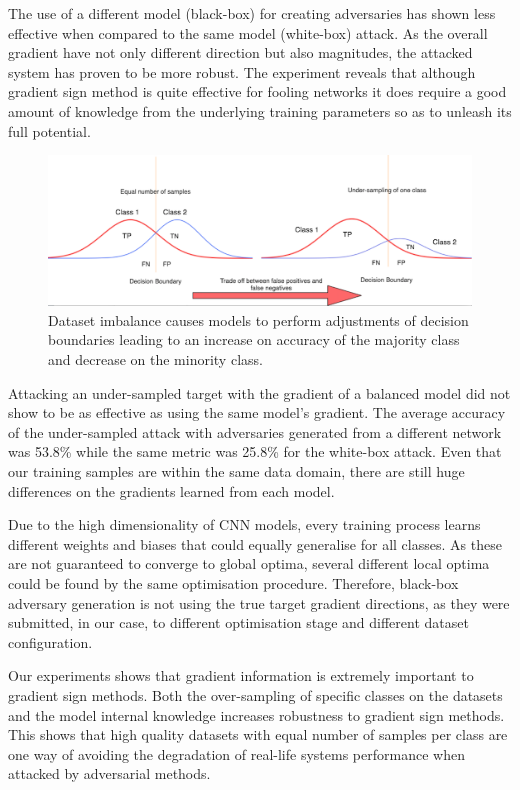 The use of a different model (black-box) for creating adversaries has shown less effective when compared to the same model (white-box) attack. As the overall gradient have not only different direction but also magnitudes, the attacked system has proven to be more robust. The experiment reveals that although gradient sign method is quite effective for fooling networks it does require a good amount of knowledge from the underlying training parameters so as to unleash its full potential.
\begin{figure}
	\centering
	\includegraphics[scale=0.32]{class_dist.png}
	\caption{Dataset imbalance causes models to perform adjustments of decision boundaries leading to an increase on accuracy of the majority class and decrease on the minority class.}
	\label{fig:class_dist}
\end{figure}
Attacking an under-sampled target with the gradient of a balanced model did not show to be as effective as using the same model's gradient. The average accuracy of the under-sampled attack with adversaries generated from a different network was 53.8\% while the same metric was 25.8\% for the white-box attack. Even that our training samples are within the same data domain, there are still huge differences on the gradients learned from each model. 

Due to the high dimensionality of CNN models, every training process learns different weights and biases that could equally generalise for all classes. As these are not guaranteed to converge to global optima, several different local optima could be found by the same optimisation procedure. Therefore, black-box adversary generation is not using the true target gradient directions, as they were submitted, in our case, to different optimisation stage and different dataset configuration.

Our experiments shows that gradient information is extremely important to gradient sign methods. Both the over-sampling of specific classes on the datasets and the model internal knowledge increases robustness to gradient sign methods. This shows that high quality datasets with equal number of samples per class are one way of avoiding the degradation of real-life systems performance when attacked by adversarial methods.

